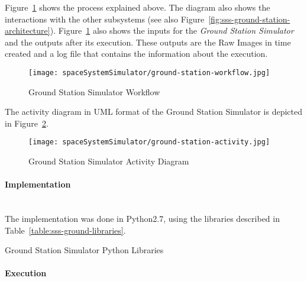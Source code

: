Figure~\ref{fig:sss-ground-station-workflow} shows the process explained above. The diagram also shows the interactions with the other subsystems (see also Figure~\ref{fig:sss-ground-station-architecture}). Figure~\ref{fig:sss-ground-station-workflow} also shows the inputs for the \emph{Ground Station Simulator} and the outputs after its execution. These outputs are the Raw Images in time created and a log file that contains the information about the execution.

\begin{figure}[!h]
\begin{center}
\texttt{[image: spaceSystemSimulator/ground-station-workflow.jpg]}
\caption{Ground Station Simulator Workflow}
\label{fig:sss-ground-station-workflow}
\end{center}
\end{figure}

The activity diagram in UML format of the Ground Station Simulator is depicted
in Figure~\ref{fig:sss-ground-station-activity}.

\begin{figure}[!h]
\begin{center}
\texttt{[image: spaceSystemSimulator/ground-station-activity.jpg]}
\caption{Ground Station Simulator Activity Diagram}
\label{fig:sss-ground-station-activity}
\end{center}
\end{figure}

\paragraph{Implementation}\label{par:sss-ground-implementation}~\\

The implementation was done in Python2.7, using the libraries described in Table~\ref{table:sss-ground-libraries}.

\begin{table}[hp]
  \centering
  {\small
  
  }
  \caption{Ground Station Simulator Python Libraries}
  \label{table:sss-ground-libraries}
\end{table}

\paragraph{Execution}\label{par:sss-ground-execution}~\\

